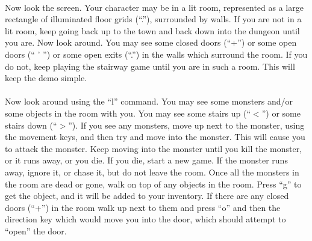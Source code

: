 \paragraph{}Now look the screen. Your character may be in a lit room, represented
as a large rectangle of illuminated floor grids (``.''), surrounded by
walls. If you are not in a lit room, keep going back up to the town and
back down into the dungeon until you are. Now look around. You may see
some closed doors (``+'') or some open doors (`` ' '') or some open exits
(``.'') in the walls which surround the room. If you do not, keep playing
the stairway game until you are in such a room. This will keep the demo
simple.

\paragraph{}Now look around using the ``l'' command. You may see some monsters and/or
some objects in the room with you. You may see some stairs up (``$<$'') or
some stairs down (``$>$''). If you see any monsters, move up next to the
monster, using the movement keys, and then try and move into the
monster. This will cause you to attack the monster. Keep moving into
the monster until you kill the monster, or it runs away, or you die. If
you die, start a new game. If the monster runs away, ignore it, or
chase it, but do not leave the room. Once all the monsters in the room
are dead or gone, walk on top of any objects in the room. Press ``g'' to
get the object, and it will be added to your inventory. If there are
any closed doors (``+'') in the room walk up next to them and press
``o''
and then the direction key which would move you into the door, which
should attempt to ``open'' the door.

